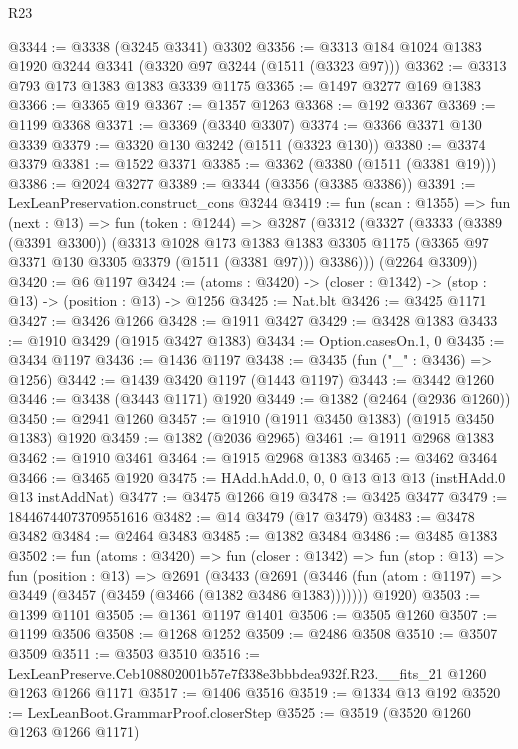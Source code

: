\begin{lexlean}{R23}
\begin{coremodule}
@3344 := @3338 (@3245 @3341) @3302
@3356 := @3313 @184 @1024 @1383 @1920 @3244 @3341 (@3320 @97 @3244 (@1511 (@3323 @97)))
@3362 := @3313 @793 @173 @1383 @1383 @3339 @1175
@3365 := @1497 @3277 @169 @1383
@3366 := @3365 @19
@3367 := @1357 @1263
@3368 := @192 @3367
@3369 := @1199 @3368
@3371 := @3369 (@3340 @3307)
@3374 := @3366 @3371 @130 @3339
@3379 := @3320 @130 @3242 (@1511 (@3323 @130))
@3380 := @3374 @3379
@3381 := @1522 @3371
@3385 := @3362 (@3380 (@1511 (@3381 @19)))
@3386 := @2024 @3277
@3389 := @3344 (@3356 (@3385 @3386))
@3391 := LexLeanPreservation.construct_cons @3244
@3419 := fun (scan : @1355) =>
  fun (next : @13) =>
  fun (token : @1244) =>
  @3287
    (@3312
      (@3327
        (@3333
          (@3389 (@3391 @3300))
          (@3313
            @1028
            @173
            @1383
            @1383
            @3305
            @1175
            (@3365 @97 @3371 @130 @3305 @3379 (@1511 (@3381 @97)))
            @3386)))
      (@2264 @3309))
@3420 := @6 @1197
@3424 := (atoms : @3420) -> (closer : @1342) -> (stop : @13) -> (position : @13) -> @1256
@3425 := Nat.blt
@3426 := @3425 @1171
@3427 := @3426 @1266
@3428 := @1911 @3427
@3429 := @3428 @1383
@3433 := @1910 @3429 (@1915 @3427 @1383)
@3434 := Option.casesOn.{1, 0}
@3435 := @3434 @1197
@3436 := @1436 @1197
@3438 := @3435 (fun ("_" : @3436) => @1256)
@3442 := @1439 @3420 @1197 (@1443 @1197)
@3443 := @3442 @1260
@3446 := @3438 (@3443 @1171) @1920
@3449 := @1382 (@2464 (@2936 @1260))
@3450 := @2941 @1260
@3457 := @1910 (@1911 @3450 @1383) (@1915 @3450 @1383) @1920
@3459 := @1382 (@2036 @2965)
@3461 := @1911 @2968 @1383
@3462 := @1910 @3461
@3464 := @1915 @2968 @1383
@3465 := @3462 @3464
@3466 := @3465 @1920
@3475 := HAdd.hAdd.{0, 0, 0} @13 @13 @13 (instHAdd.{0} @13 instAddNat)
@3477 := @3475 @1266 @19
@3478 := @3425 @3477
@3479 := 18446744073709551616
@3482 := @14 @3479 (@17 @3479)
@3483 := @3478 @3482
@3484 := @2464 @3483
@3485 := @1382 @3484
@3486 := @3485 @1383
@3502 := fun (atoms : @3420) =>
  fun (closer : @1342) =>
  fun (stop : @13) =>
  fun (position : @13) =>
  @2691
    (@3433
      (@2691 (@3446 (fun (atom : @1197) => @3449 (@3457 (@3459 (@3466 (@1382 @3486 @1383)))))))
      @1920)
@3503 := @1399 @1101
@3505 := @1361 @1197 @1401
@3506 := @3505 @1260
@3507 := @1199 @3506
@3508 := @1268 @1252
@3509 := @2486 @3508
@3510 := @3507 @3509
@3511 := @3503 @3510
@3516 := LexLeanPreserve.Ceb108802001b57e7f338e3bbbdea932f.R23.__fits_21 @1260 @1263 @1266 @1171
@3517 := @1406 @3516
@3519 := @1334 @13 @192
@3520 := LexLeanBoot.GrammarProof.closerStep
@3525 := @3519 (@3520 @1260 @1263 @1266 @1171)

\end{coremodule}
\end{lexlean}
